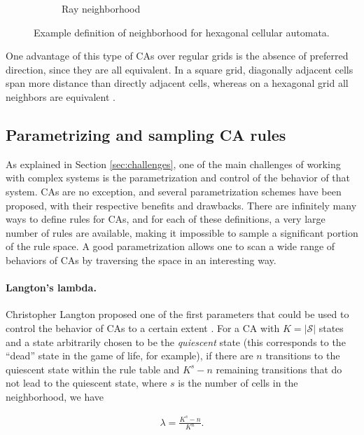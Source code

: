 \begin{figure}[htbp]
\begin{subfigure}[b]{.35\linewidth}
    \caption{Ray neighborhood}
    \label{fig:hexagonal_2}
  \end{subfigure}
  \caption{Example definition of neighborhood for hexagonal cellular automata.}
\label{fig:hexagonal}
\end{figure}

One advantage of this type of \acp{CA} over regular grids is the absence of
preferred direction, since they are all equivalent. In a square grid, diagonally
adjacent cells span more distance than directly adjacent cells, whereas on a   
hexagonal grid all neighbors are equivalent
\parencite{moreeHexagonalSquareLattice2004}.

\subsection{Parametrizing and sampling CA rules}
As explained in Section \ref{sec:challenges}, one of the main challenges of
working with complex systems is the parametrization and control of the behavior
of that system. \acp{CA} are no exception, and several parametrization schemes
have been proposed, with their respective benefits and drawbacks. There are
infinitely many ways to define rules for \acp{CA}, and for each of these
definitions, a very large number of rules are available, making it impossible to
sample a significant portion of the rule space. A good parametrization allows one 
to scan a wide range of behaviors of \acp{CA} by traversing the space in an
interesting way.

\paragraph{Langton's lambda\label{sec:langtons-lambda}.}

Christopher Langton proposed one of the first parameters that could be used to
control the behavior of \acp{CA} to a certain extent
\parencite{langtonStudyingArtificialLife1986, langtonComputationEdgeChaos1990}.
For a \ac{CA} with $K = |\mathcal{S}|$ states and a state arbitrarily chosen to
be the \emph{quiescent} state (this corresponds to the ``dead'' state in the
game of life, for example), if there are $n$ transitions to the quiescent state
within the rule table and $K^{s} - n$ remaining transitions that do not lead to
the quiescent state, where $s$ is the number of cells in the neighborhood, we
have

\begin{equation}
  \label{eq:langton}
  \begin{aligned}
    \lambda = \frac{K^{s} - n}{K^{n}}.
  \end{aligned}
\end{equation}

